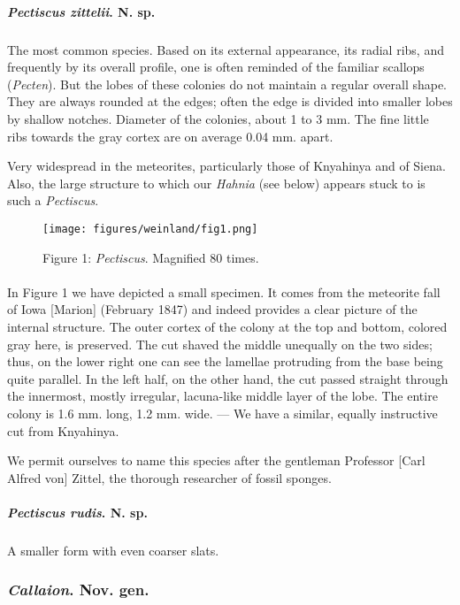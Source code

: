 \documentclass[a4paper, 12pt, oneside]{article}
\begin{document}
\paragraph{\emph{Pectiscus zittelii}. N. sp.}
\subparagraph{}
The most common species. Based on its external appearance, its radial ribs, and frequently by its overall profile, one is often reminded of the familiar scallops (\emph{Pecten}). But the lobes of these colonies do not maintain a regular overall shape. They are always rounded at the edges; often the edge is divided into smaller lobes by shallow notches. Diameter of the colonies, about 1 to 3 mm. The fine little ribs towards the gray cortex are on average 0.04 mm. apart.

Very widespread in the meteorites, particularly those of Knyahinya and of Siena. Also, the large structure to which our \emph{Hahnia} (see below) appears stuck to is such a \emph{Pectiscus}.
\begin{figure}[H]
\centering
\texttt{[image: figures/weinland/fig1.png]}
\caption{Figure 1: \emph{Pectiscus}. Magnified 80 times.}
\end{figure}
\paragraph*{}
In Figure 1 we have depicted a small specimen. It comes from the meteorite fall of Iowa [Marion] (February 1847) and indeed provides a clear picture of the internal structure. The outer cortex of the colony at the top and bottom, colored gray here, is preserved. The cut shaved the middle unequally on the two sides; thus, on the lower right one can see the lamellae protruding from the base being quite parallel. In the left half, on the other hand, the cut passed straight through the innermost, mostly irregular, lacuna-like middle layer of the lobe. The entire colony is 1.6 mm. long, 1.2 mm. wide. --- We have a similar, equally instructive cut from Knyahinya.

We permit ourselves to name this species after the gentleman Professor [Carl Alfred von] Zittel, the thorough researcher of fossil sponges.
\paragraph{\emph{Pectiscus rudis}. N. sp.}
\subparagraph{}
A smaller form with even coarser slats.
\subsubsection{\emph{Callaion}. Nov. gen.}
\end{document}
